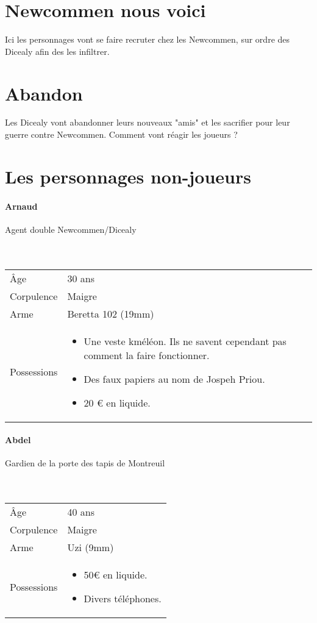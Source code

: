 \documentclass[10pt,a4paper,twocolumn]{article}
\begin{document}
\section{Newcommen nous voici}
Ici les personnages vont se faire recruter chez les Newcommen, sur ordre des Dicealy afin des les infiltrer.

\section{Abandon}
Les Dicealy vont abandonner leurs nouveaux "amis" et les sacrifier pour leur guerre contre Newcommen. Comment vont réagir les joueurs ?
\newpage
\section*{Les personnages non-joueurs}
\hypertarget{arnaud}{\paragraph{Arnaud}} Agent double Newcommen/Dicealy\\ \\
\
\begin{tabular}{l|p{}}
	Âge & 30 ans\\
	Corpulence & Maigre \\
	Arme & Beretta 102 (19mm) \\
	Possessions & \begin{itemize}
	\item Une veste kméléon. Ils ne savent cependant pas comment la faire fonctionner.
	\item Des faux papiers au nom de Jospeh Priou.
	\item 20 € en liquide.
\end{itemize} \\
\end{tabular}
\hypertarget{abdel}{\paragraph{Abdel}} Gardien de la porte des tapis de Montreuil\\ \\
\
\begin{tabular}{l|p{0.3\textwidth}}
	Âge & 40 ans\\
	Corpulence & Maigre \\
	Arme & Uzi (9mm) \\
	Possessions & \begin{itemize}
	\item 50€ en liquide.
	\item Divers téléphones.
\end{itemize}	 \\
\end{tabular}
\end{document}

